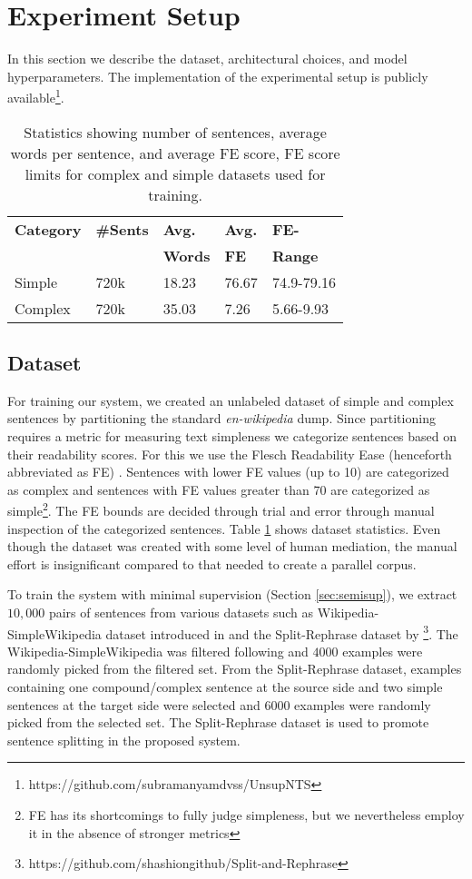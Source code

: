 \documentclass[11pt,a4paper]{article}
\begin{document}
 \section{Experiment Setup}
\label{sec:exp}
In this section we describe the dataset, architectural choices, and model hyperparameters. The implementation of the experimental setup is publicly available\footnote{https://github.com/subramanyamdvss/UnsupNTS}.
\begin{table}[t]
\centering
\footnotesize
\begin{tabular}{lllll}
    \toprule
    \textbf{Category} & \textbf{\#Sents} & \textbf{Avg.} & \textbf{Avg.} & \textbf{FE-} \\
     & & \textbf{Words} & \textbf{FE} & \textbf{Range} \\
    \midrule
    Simple  & 720k & 18.23 & 76.67 & 74.9-79.16\\
    Complex & 720k & 35.03 & 7.26 & 5.66-9.93\\
    \bottomrule
\end{tabular}
\caption{Statistics showing number of sentences, average words per sentence, and average FE score, FE score limits for complex and simple datasets used for training.}
\label{tab:datastat}
\end{table}
\subsection{Dataset}
\label{subsec:dataset}
For training our system, we created an unlabeled dataset of simple and complex sentences by partitioning the standard \textit{en-wikipedia} dump. Since partitioning requires a metric for measuring text simpleness we categorize sentences based on their readability scores. For this we use the Flesch Readability Ease (henceforth abbreviated as FE) \cite{flesch1948new}. Sentences with lower FE values (up to 10) are categorized as complex and sentences with FE values greater than 70 are categorized as simple\footnote{FE has its shortcomings to fully judge simpleness, but we nevertheless employ it in the absence of stronger metrics}. The FE bounds are decided through trial and error through manual inspection of the categorized sentences. Table \ref{tab:datastat} shows dataset statistics. Even though the dataset was created with some level of human mediation, the manual effort is insignificant compared to that needed to create a parallel  corpus. 

To train the system with minimal supervision (Section \ref{sec:semisup}), we extract $10,000$ pairs of sentences from various datasets such as Wikipedia-SimpleWikipedia dataset introduced in  and the Split-Rephrase dataset by \footnote{https://github.com/shashiongithub/Split-and-Rephrase}. The Wikipedia-SimpleWikipedia was filtered following  and $4000$ examples were randomly picked from the filtered set. From the Split-Rephrase dataset, examples containing one compound/complex sentence at the source side and two simple sentences at the target side were selected and $6000$ examples were randomly picked from the selected set. The Split-Rephrase dataset is used to promote sentence splitting in the proposed system.
\end{document}
